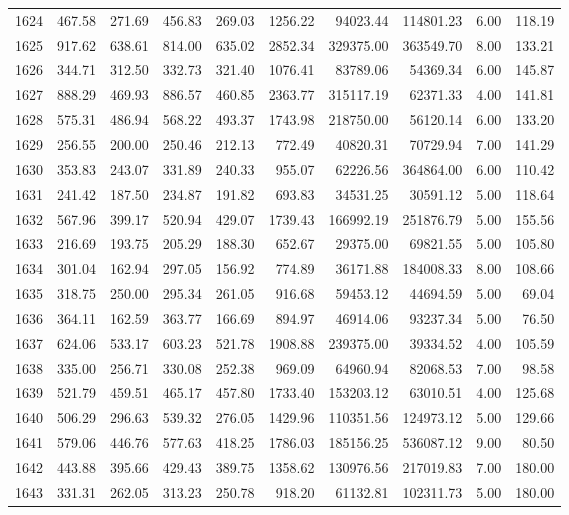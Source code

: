 \begin{tabular}{lrrrrrrrrr}
1624 & 467.58 & 271.69 & 456.83 & 269.03 & 1256.22 & 94023.44 & 114801.23 & 6.00 & 118.19 \\
1625 & 917.62 & 638.61 & 814.00 & 635.02 & 2852.34 & 329375.00 & 363549.70 & 8.00 & 133.21 \\
1626 & 344.71 & 312.50 & 332.73 & 321.40 & 1076.41 & 83789.06 & 54369.34 & 6.00 & 145.87 \\
1627 & 888.29 & 469.93 & 886.57 & 460.85 & 2363.77 & 315117.19 & 62371.33 & 4.00 & 141.81 \\
1628 & 575.31 & 486.94 & 568.22 & 493.37 & 1743.98 & 218750.00 & 56120.14 & 6.00 & 133.20 \\
1629 & 256.55 & 200.00 & 250.46 & 212.13 & 772.49 & 40820.31 & 70729.94 & 7.00 & 141.29 \\
1630 & 353.83 & 243.07 & 331.89 & 240.33 & 955.07 & 62226.56 & 364864.00 & 6.00 & 110.42 \\
1631 & 241.42 & 187.50 & 234.87 & 191.82 & 693.83 & 34531.25 & 30591.12 & 5.00 & 118.64 \\
1632 & 567.96 & 399.17 & 520.94 & 429.07 & 1739.43 & 166992.19 & 251876.79 & 5.00 & 155.56 \\
1633 & 216.69 & 193.75 & 205.29 & 188.30 & 652.67 & 29375.00 & 69821.55 & 5.00 & 105.80 \\
1634 & 301.04 & 162.94 & 297.05 & 156.92 & 774.89 & 36171.88 & 184008.33 & 8.00 & 108.66 \\
1635 & 318.75 & 250.00 & 295.34 & 261.05 & 916.68 & 59453.12 & 44694.59 & 5.00 & 69.04 \\
1636 & 364.11 & 162.59 & 363.77 & 166.69 & 894.97 & 46914.06 & 93237.34 & 5.00 & 76.50 \\
1637 & 624.06 & 533.17 & 603.23 & 521.78 & 1908.88 & 239375.00 & 39334.52 & 4.00 & 105.59 \\
1638 & 335.00 & 256.71 & 330.08 & 252.38 & 969.09 & 64960.94 & 82068.53 & 7.00 & 98.58 \\
1639 & 521.79 & 459.51 & 465.17 & 457.80 & 1733.40 & 153203.12 & 63010.51 & 4.00 & 125.68 \\
1640 & 506.29 & 296.63 & 539.32 & 276.05 & 1429.96 & 110351.56 & 124973.12 & 5.00 & 129.66 \\
1641 & 579.06 & 446.76 & 577.63 & 418.25 & 1786.03 & 185156.25 & 536087.12 & 9.00 & 80.50 \\
1642 & 443.88 & 395.66 & 429.43 & 389.75 & 1358.62 & 130976.56 & 217019.83 & 7.00 & 180.00 \\
1643 & 331.31 & 262.05 & 313.23 & 250.78 & 918.20 & 61132.81 & 102311.73 & 5.00 & 180.00 \\

\end{tabular}
